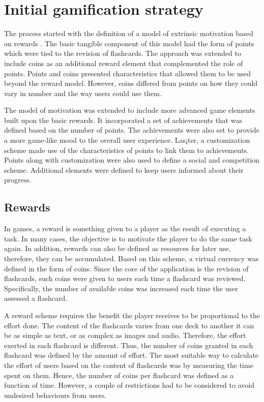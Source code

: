 \section{Initial gamification strategy}
\label{desi-gamification-strategy}
The process started with the definition of a model of extrinsic motivation based on rewards \citep{richter2015studying}. The basic tangible component of this model had the form of points which were tied to the revision of flashcards. The approach was extended to include coins as an additional reward element that complemented the role of points. Points and coins presented characteristics that allowed them to be used beyond the reward model. However, coins differed from points on how they could vary in number and the way users could use them.

The model of motivation was extended to include more advanced game elements built upon the basic rewards. It incorporated a set of achievements that was defined based on the number of points. The achievements were also set to provide a more game-like mood to the overall user experience. Las¡ter, a customization scheme made use of the characteristics of points to link them to achievements. Points along with customization were also used to define a social and competition scheme. Additional elements were defined to keep users informed about their progress.

\subsection{Rewards}
In games, a reward is something given to a player as the result of executing a task. In many cases, the objective is to motivate the player to do the same task again. In addition, rewards can also be defined as resources for later use, therefore, they can be accumulated. Based on this scheme, a virtual currency was defined in the form of coins. Since the core of the application is the revision of flashcards, such coins were given to users each time a flashcard was reviewed. Specifically, the number of available coins was increased each time the user assessed a flashcard.

A reward scheme requires the benefit the player receives to be proportional to the effort done. The content of the flashcards varies from one deck to another it can be as simple as text, or as complex as images and audio. Therefore, the effort exerted in each flashcard is different. Thus, the number of coins granted in each flashcard was defined by the amount of effort. The most suitable way to calculate the effort of users based on the content of flashcards was by measuring the time spent on them. Hence, the number of coins per flashcard was defined as a function of time. However, a couple of restrictions had to be considered to avoid undesired behaviours from users.


